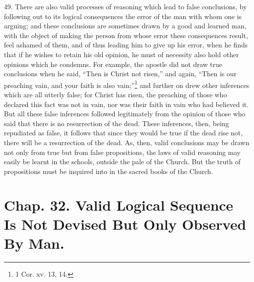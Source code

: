 49. There are also valid processes of reasoning which lead to false
conclusions, by following out to its logical consequences the error of
the man with whom one is arguing; and these conclusions are sometimes
drawn by a good and learned man, with the object of making the person
from whose error these consequences result, feel ashamed of them, and
of thus leading him to give up his error, when he finds that if he
wishes to retain his old opinion, he must of necessity also hold other
opinions which he condemns. For example, the apostle did not draw true
conclusions when he said, ``Then is Christ not risen,'' and again,
``Then is our preaching vain, and your faith is also
vain;''\footnote{1 Cor. xv. 13, 14.} and further on drew other
inferences which are all utterly false; for Christ has risen, the
preaching of those who declared this fact was not in vain, nor was
their faith in vain who had believed it. But all these false
inferences followed legitimately from the opinion of those who said
that there is no resurrection of the dead. These inferences, then,
being repudiated as false, it follows that since they would be true if
the dead rise not, there will be a resurrection of the dead. As, then,
valid conclusions may be drawn not only from true but from false
propositions, the laws of valid reasoning may easily be learnt in the
schools, outside the pale of the Church. But the truth of propositions
must be inquired into in the sacred books of the Church.

\section{Chap. 32. Valid Logical Sequence Is Not Devised But Only
Observed By Man.}

